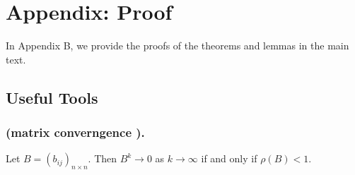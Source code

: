 \documentclass[sigconf,review, nonacm]{acmart}
\begin{document}
%

\section{Appendix: Proof}
In Appendix B, we provide the proofs of the theorems and lemmas in the main text.
\subsection{Useful Tools}
\subsubsection{(matrix converngence ).}

\begin{lemma}
\label{lem:matrix}
Let $B = (b_{ij})_{n \times n}$. Then $B^k \to 0$ as $k \to \infty$ if and only if $\rho(B) < 1$.
\end{lemma}
\end{document}
